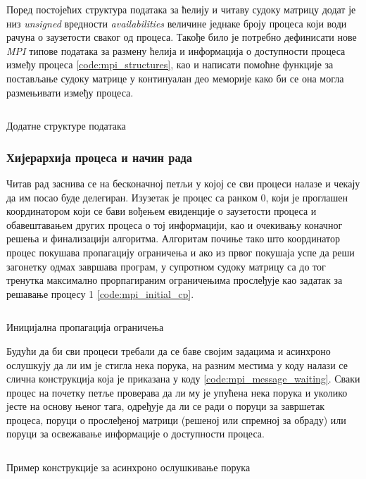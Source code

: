 Поред постојећих структура података за ћелију и читаву судоку матрицу додат је низ \textit{unsigned} вредности \textit{availabilities} величине једнаке броју процеса који води рачуна о заузетости сваког од процеса. Такође било је потребно дефинисати нове \textit{MPI} типове података за размену ћелија и информација о доступности процеса између процеса \ref{code:mpi_structures}, као и написати помоћне функције за постављање судоку матрице у континуалан део меморије како би се она могла размењивати између процеса.

\begin{listing}[H]
\inputminted{c}{kodovi/mpi_structures.c}
\caption{Додатне структуре података}
\label{code:mpi_structures}
\end{listing}

\subsubsection{Хијерархија процеса и начин рада}

Читав рад заснива се на бесконачној петљи у којој се сви процеси налазе и чекају да им посао буде делегиран. Изузетак је процес са ранком 0, који је проглашен координатором који се бави вођењем евиденције о заузетости процеса и обавештавањем других процеса о тој информацији, као и очекивању коначног решења и финализацији алгоритма. Алгоритам почиње тако што координатор процес покушава пропагацију ограничења и ако из првог покушаја успе да реши загонетку одмах завршава програм, у супротном судоку матрицу са до тог тренутка максимално прорпагираним ограничењима прослеђује као задатак за решавање процесу 1 \ref{code:mpi_initial_cp}. 

\begin{listing}[H]
\inputminted{c}{kodovi/mpi_initial_cp.c}
\caption{Иницијална пропагација ограничења}
\label{code:mpi_initial_cp}
\end{listing}

Будући да би сви процеси требали да се баве својим задацима и асинхроно ослушкују да ли им је стигла нека порука, на разним местима у коду налази се слична конструкција која је приказана у коду \ref{code:mpi_message_waiting}. Сваки процес на почетку петље проверава да ли му је упућена нека порука и уколико јесте на основу њеног тага, одређује да ли се ради о поруци за завршетак процеса, поруци о прослеђеној матрици (решеној или спремној за обраду) или поруци за освежавање информације о доступности процеса.

\begin{listing}[H]
\inputminted{c}{kodovi/mpi_message_waiting.c}
\caption{Пример конструкције за  асинхроно ослушкивање порука}
\label{code:mpi_message_waiting}
\end{listing}

